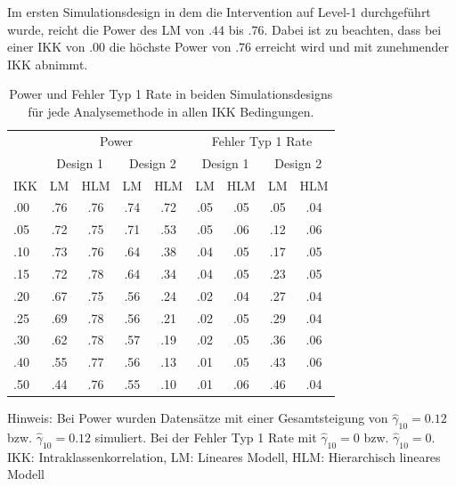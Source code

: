 \documentclass[12pt, a4paper]{article}\usepackage[]{graphicx}\usepackage[]{color}
\begin{document}
Im ersten Simulationsdesign in dem die Intervention auf Level-1 durchgeführt wurde, reicht die Power des LM von $.44$ bis $.76$. Dabei ist zu beachten, dass bei einer IKK von .00 die höchste Power von $.76$ erreicht wird und mit zunehmender IKK abnimmt.
\begin{table}[t!]
\centering
\setlength{\tabcolsep}{10pt}
\begin{threeparttable}
\caption{Power und Fehler Typ 1 Rate in beiden Simulationsdesigns für jede Analysemethode in allen IKK Bedingungen.}
\begin{tabular}{lcccccccc}
\toprule
	& \multicolumn{4}{c}{Power} & \multicolumn{4}{c}{Fehler Typ 1 Rate}\\
\cmidrule(lr){2-5} \cmidrule(lr){6-9}
	& \multicolumn{2}{c}{Design 1} 
	& \multicolumn{2}{c}{Design 2} 
	& \multicolumn{2}{c}{Design 1} 
	& \multicolumn{2}{c}{Design 2}\\
\cmidrule(lr){2-3} \cmidrule(lr){4-5} \cmidrule(lr){6-7} \cmidrule(lr){8-9}
IKK & LM  & HLM & LM  & HLM & LM   & HLM & LM  & HLM\\ 
\midrule
.00 & .76 & .76 & .74 & .72 & .05  & .05 & .05 & .04\\
.05 & .72 & .75 & .71 & .53 & .05  & .06 & .12 & .06\\
.10 & .73 & .76 & .64 & .38 & .04  & .05 & .17 & .05\\
.15 & .72 & .78 & .64 & .34 & .04  & .05 & .23 & .05\\
.20 & .67 & .75 & .56 & .24 & .02  & .04 & .27 & .04\\
.25 & .69 & .78 & .56 & .21 & .02  & .05 & .29 & .04\\
.30 & .62 & .78 & .57 & .19 & .02  & .05 & .36 & .06\\
.40 & .55 & .77 & .56 & .13 & .01  & .05 & .43 & .06\\
.50 & .44 & .76 & .55 & .10 & .01  & .06 & .46 & .04\\
\bottomrule
\end{tabular}
\label{tab:power_study2}
\begin{tablenotes}[flushleft]
\footnotesize
\item
Hinweis: Bei Power wurden Datensätze mit einer Gesamtsteigung von $\widehat{\gamma}_{10} = 0.12$ bzw. $\widehat{\gamma}_{10} = 0.12$ simuliert. Bei der Fehler Typ 1 Rate mit $\widehat{\gamma}_{10} = 0$ bzw. $\widehat{\gamma}_{10} = 0$. IKK: Intraklassenkorrelation, LM: Lineares Modell, HLM: Hierarchisch lineares Modell
\end{tablenotes}
\end{threeparttable}
\end{table} 
\end{document}

